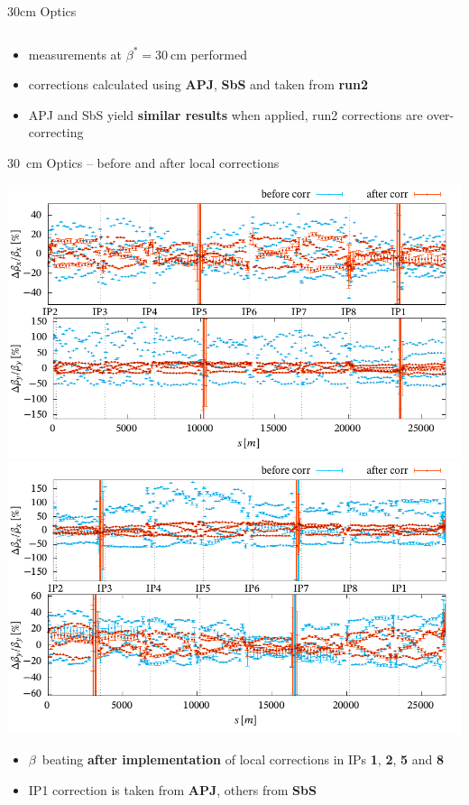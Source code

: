 \documentclass[11pt,usenames,dvipsnames,aspectratio=169]{beamer}
\newcommand{\highl}[1]{\textbf{#1}}
\begin{document}
\begin{frame}{30cm Optics }
\begin{center}
{{\begin{tabular}{l|lSSS|c|}
        \end{tabular} 
        }
        }
    \end{center}
    \begin{itemize}
        \item measurements at $\beta^*=\SI{30}{\centi\meter}$ performed
        \item corrections calculated using \highl{APJ}, \highl{SbS} and taken from \highl{run2}
        \item APJ and SbS yield \highl{similar results} when applied,
            run2 corrections are over-correcting
    \end{itemize}
\end{frame}


\begin{frame}{\SI{30}{cm} Optics -- before and after local corrections}

    \begin{center}
    \includegraphics[width=0.49\linewidth]{images/squeeze/b1_bb_comp.pdf}
    \hfill
    \includegraphics[width=0.49\linewidth]{images/squeeze/b2_bb_comp.pdf}
    \end{center}
    
    \begin{itemize}
        \item $\beta$~beating \highl{after implementation} of local corrections in IPs \textbf{1}, \textbf{2}, \textbf{5} and \textbf{8}
        \item IP1 correction is taken from \highl{APJ}, others from \highl{SbS}
    \end{itemize}
    
\end{frame}
\end{document}
